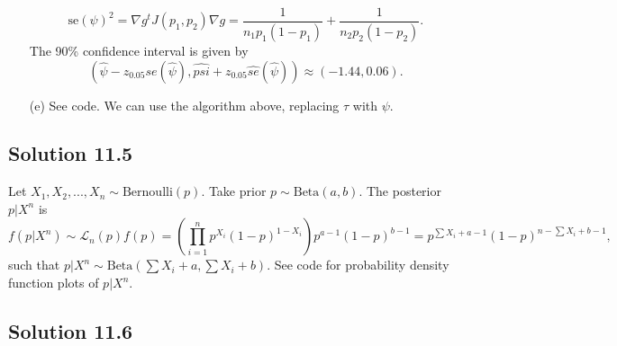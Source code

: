 \begin{itemize}
\begin{equation*}
            \mathrm{se}(\psi)^2
                = \nabla g^t J(p_1, p_2) \nabla g
                = \frac{1}{n_1 p_1 (1 - p_1)} + \frac{1}{n_2 p_2 (1 - p_2)}.
        \end{equation*}
        The 90\% confidence interval is given by
        \begin{equation*}
            (\hat{\psi} - z_{0.05}\hat{se}(\hat{\psi}), \hat{psi} + z_{0.05}\hat{se}(\hat{\psi}))
            \approx (-1.44, 0.06).
        \end{equation*}
    \item[(e)] See code.
        We can use the algorithm above, replacing $\tau$ with $\psi$.
\end{itemize}


\subsection*{Solution 11.5}

Let $X_1, X_2, ..., X_{n} \sim \mathrm{Bernoulli}(p)$.
Take prior $p \sim \mathrm{Beta}(a, b)$.
The posterior $p|X^n$ is
\begin{equation*}
    f(p|X^n) \sim \mathcal{L}_n(p) f(p)
        = \left(\prod_{i = 1}^n p^{X_i}(1 - p)^{1 - X_i}\right) p^{a - 1} (1 - p)^{b - 1}
        = p^{\sum X_i + a - 1} (1 - p)^{n - \sum X_i + b - 1},
\end{equation*}
such that $p|X^n \sim \mathrm{Beta}(\sum X_i + a, \sum X_i + b)$.
See code for probability density function plots of $p|X^n$.


\subsection*{Solution 11.6}

